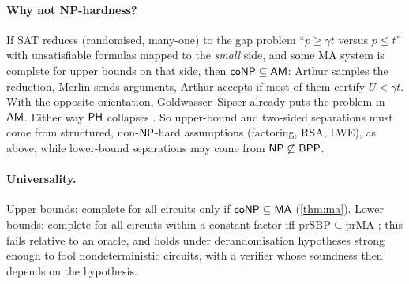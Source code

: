 \paragraph{Why not NP-hardness?} If SAT reduces (randomised, many-one) to the
gap problem ``$p\ge\gamma t$ versus $p\le t$'' with unsatisfiable formulas
mapped to the \emph{small} side, and some MA system is complete for upper
bounds on that side, then $\mathsf{coNP}\subseteq\mathsf{AM}$: Arthur samples the reduction,
Merlin sends arguments, Arthur accepts if most of them certify $U<\gamma t$.
With the opposite orientation, Goldwasser--Sipser already puts the problem
in $\mathsf{AM}$. Either way $\mathsf{PH}$ collapses \cite{bhz1987}. So upper-bound and
two-sided separations must come from structured, non-$\mathsf{NP}$-hard assumptions
(factoring, RSA, LWE), as above, while lower-bound separations may come from
$\mathsf{NP}\not\subseteq\mathsf{BPP}$.

\paragraph{Universality.} Upper bounds: complete for all circuits only if
$\mathsf{coNP}\subseteq\mathsf{MA}$ (\cref{thm:ma}). Lower bounds: complete for all circuits
within a constant factor iff $\mathrm{prSBP}\subseteq\mathrm{prMA}$
\cite{bgm2006}; this fails relative to an oracle, and holds under derandomisation
hypotheses strong enough to fool nondeterministic circuits, with a verifier
whose soundness then depends on the hypothesis.
